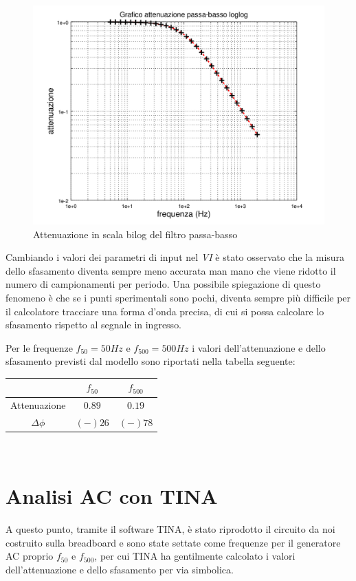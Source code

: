 \documentclass[journal, a4paper]{IEEEtran}
\begin{document}
\begin{figure}
\centering
\includegraphics[width=1.1\linewidth]{./attenuaz_passa_basso_loglog}
\caption{Attenuazione in scala bilog del filtro passa-basso}
\label{fig:attenuaz_passa_basso_loglog}
\end{figure}



Cambiando i valori dei parametri di input nel \textit{VI} è stato osservato che la misura dello sfasamento diventa sempre meno accurata man mano che viene ridotto il numero di campionamenti per periodo. Una possibile spiegazione di questo fenomeno è che se i punti sperimentali sono pochi, diventa sempre più difficile per il calcolatore tracciare una forma d'onda precisa, di cui si possa calcolare lo sfasamento rispetto al segnale in ingresso.

Per le frequenze $f_{50} = 50 Hz$ e $f_{500} = 500 Hz$ i valori dell'attenuazione e dello sfasamento previsti dal modello sono riportati nella tabella seguente:\\

\begin{tabular}{|c|c|c|}
\hline  & $f_{50}$ & $f_{500}$ \\ 
\hline Attenuazione & $0.89$ & $0.19$ \\ 
\hline $\Delta \phi $& $(-)26$  & $(-)78$ \\ 
\hline 
\end{tabular} \\


\section{Analisi AC con TINA}
A questo punto, tramite il software \textsc{TINA}, è stato riprodotto il circuito da noi costruito sulla breadboard e sono state settate come frequenze per il generatore AC proprio  $f_{50}$ e $f_{500}$, per cui \textsc{TINA} ha gentilmente calcolato i valori dell'attenuazione e dello sfasamento per via simbolica. \\
\end{document}
